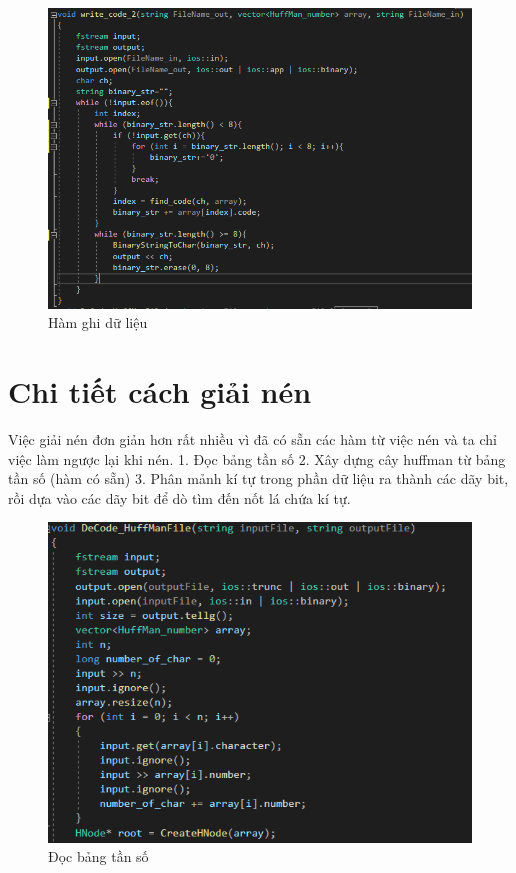\documentclass[14pt]{extreport}
\begin{document}
\begin{center}
    \begin{figure}[H]
    \begin{center}
     \includegraphics[scale=1.0]{write_code.PNG}
    \end{center}
    \caption{Hàm ghi dữ liệu}
    \label{refhinh1}
    \end{figure}
\end{center}
\section{Chi tiết cách giải nén}
Việc giải nén đơn giản hơn rất nhiều vì đã có sẵn các hàm từ việc nén và ta chỉ việc làm ngược lại khi nén.
1. Đọc bảng tần số
2. Xây dựng cây huffman từ bảng tần số (hàm có sẵn)
3. Phân mảnh kí tự trong phần dữ liệu ra thành các dãy bit, rồi dựa vào các dãy bit để dò tìm đến nốt lá chứa kí tự.

\begin{center}
    \begin{figure}[H]
    \begin{center}
     \includegraphics[scale=1.0]{decode_1.PNG}
    \end{center}
    \caption{Đọc bảng tần số}
    \label{refhinh1}
    \end{figure}
\end{center}
\end{document}
